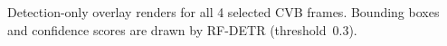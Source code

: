 \caption{Detection-only overlay renders for all 4 selected CVB frames. Bounding boxes and confidence scores are drawn by RF-DETR (threshold~0.3).}\label{fig:detection-gallery-cvb}
